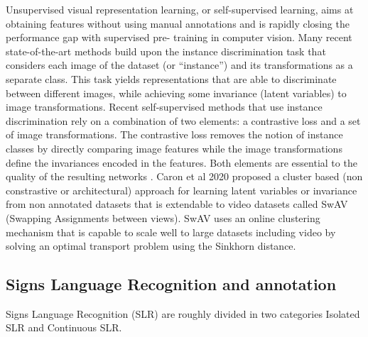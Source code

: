 \documentclass[twocolumn,conference]{article}
\begin{document}
Unsupervised visual representation learning, or self-supervised learning, aims at obtaining features without using manual annotations and is rapidly closing the performance gap with supervised pre- training in computer vision. Many recent state-of-the-art methods build upon the instance discrimination task that considers each image of the dataset (or “instance”) and its transformations as a separate class. This task yields representations that are able to discriminate between different images, while achieving some invariance (latent variables) to image transformations. Recent self-supervised methods that use instance discrimination rely on a combination of two elements: a contrastive loss and a set of image transformations. The contrastive loss removes the notion of instance classes by directly comparing image features while the image transformations define the invariances encoded in the features. Both elements are essential to the quality of the resulting networks \cite{caron2020unsupervised}. Caron et al 2020 proposed a cluster based (non constrastive or architectural) approach for learning latent variables or invariance from non annotated datasets that is extendable to video datasets called SwAV (Swapping Assignments between views). SwAV uses an online clustering mechanism that is capable to scale well to large datasets including video by solving an optimal transport problem using the Sinkhorn distance. 

\subsection{Signs Language Recognition and annotation}
Signs Language Recognition (SLR) are roughly divided in two categories Isolated SLR and Continuous SLR\cite{adaloglou2020comprehensive}.
\end{document}
